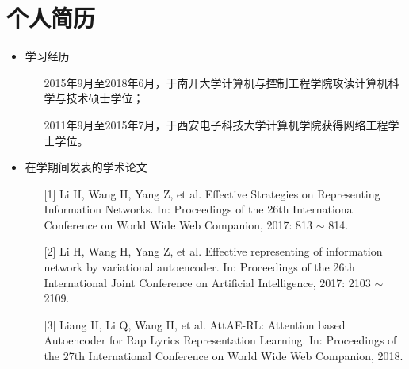 
\iffalse



\fi
{}
\chapter*{个人简历}
\begin{refsection}[mysuperbib]
   
\begin{itemize}
    \item 学习经历
    \begin{itemize}
        \item []2015年9月至2018年6月，于南开大学计算机与控制工程学院攻读计算机科学与技术硕士学位；
        \item []2011年9月至2015年7月，于西安电子科技大学计算机学院获得网络工程学士学位。
    \end{itemize}

    \item 在学期间发表的学术论文
    \begin{itemize}

        \item [{[1]}] Li H, Wang H, Yang Z, et al. Effective Strategies on Representing Information Networks. In: Proceedings of the 26th International Conference on World Wide Web Companion, 2017: 813 $\sim$ 814.
        \item [{[2]}] Li H, Wang H, Yang Z, et al. Effective representing of information network by variational autoencoder. In: Proceedings of the 26th International Joint Conference on Artificial Intelligence, 2017: 2103 $\sim$ 2109.
        \item [{[3]}] Liang H, Li Q, Wang H, et al. AttAE-RL: Attention based Autoencoder for Rap Lyrics Representation Learning. In: Proceedings of the 27th International Conference on World Wide Web Companion, 2018.
    \end{itemize}
\end{itemize}
\end{refsection}

{}